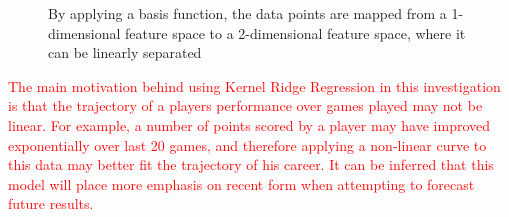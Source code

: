 \documentclass[a4paper,11pt,twoside]{article}
\begin{document}
      \begin{figure}[!htb]
      \captionsetup{justification=centering}
        \caption{\label{fig:my-label}By applying a basis function, the data points are mapped from a 1-dimensional feature space to a 2-dimensional feature space, where it can be linearly separated}
      \end{figure}

\textcolor{red}{The main motivation behind using Kernel Ridge Regression in this investigation is that the trajectory of a players performance over games played may not be linear. For example, a number of points scored by a player may have improved exponentially over last 20 games, and therefore applying a non-linear curve to this data may better fit the trajectory of his career. It can be inferred that this model will place more emphasis on recent form when attempting to forecast future results.}
\end{document}
